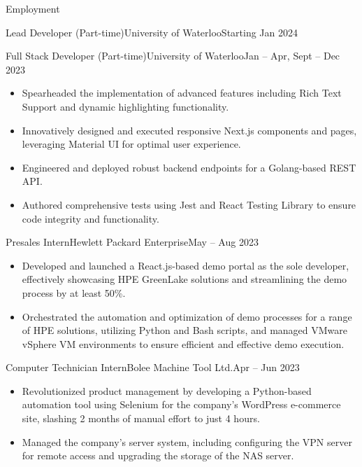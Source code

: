 \documentclass[]{mcdowellcv}
\begin{document}
	\begin{cvsection}{Employment}
		\begin{cvsubsection}{Lead Developer (Part-time)}{University of Waterloo}{Starting Jan 2024}		
		\end{cvsubsection}
		\begin{cvsubsection}{Full Stack Developer (Part-time)}{University of Waterloo}{Jan -- Apr, Sept -- Dec 2023}
			\begin{itemize}
				\item Spearheaded the implementation of advanced features including Rich Text Support and dynamic highlighting functionality.
				\item Innovatively designed and executed responsive Next.js components and pages, leveraging Material UI for optimal user experience.
				\item Engineered and deployed robust backend endpoints for a Golang-based REST API.
				\item Authored comprehensive tests using Jest and React Testing Library to ensure code integrity and functionality.
			\end{itemize}
		\end{cvsubsection}
		\begin{cvsubsection}{Presales Intern}{Hewlett Packard Enterprise}{May -- Aug 2023}	
			\begin{itemize}
				\item Developed and launched a React.js-based demo portal as the sole developer, effectively showcasing HPE GreenLake solutions and streamlining the demo process by at least 50\%.
				\item Orchestrated the automation and optimization of demo processes for a range of HPE solutions, utilizing Python and Bash scripts, and managed VMware vSphere VM environments to ensure efficient and effective demo execution.
			\end{itemize}
		\end{cvsubsection}
		\begin{cvsubsection}{Computer Technician Intern}{Bolee Machine Tool Ltd.}{Apr -- Jun 2023}	
			\begin{itemize}
				\item Revolutionized product management by developing a Python-based automation tool using Selenium for the company's WordPress e-commerce site, slashing 2 months of manual effort to just 4 hours.
				\item Managed the company’s server system, including configuring the VPN server for remote access and upgrading the storage of the NAS server.
			\end{itemize}
		\end{cvsubsection}
	\end{cvsection}
	
\end{document}
